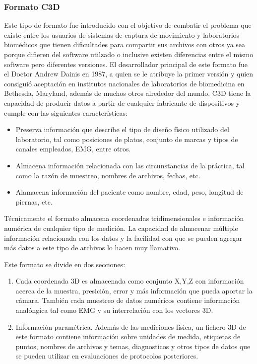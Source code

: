 \documentclass[11pt,letterpaper]{article}     %
\begin{document}
\subsubsection{Formato C3D}
Este tipo de formato fue introducido con el objetivo de combatir el problema que existe entre los usuarios de sistemas de captura de movimiento y laboratorios biom\' edicos que tienen dificultades para compartir sus archivos con otros ya sea porque difieren del software utilzado o inclusive existen diferencias entre el mismo software pero diferentes versiones. 
El desarrollador principal de este formato fue el Doctor Andrew Dainis en 1987, a quien se le atribuye la primer versi\' on y quien consigui\' o aceptaci\' on en institutos nacionales de laboratorios de biomedicina en Bethesda, Maryland, adem\' as de muchos otros alrededor del mundo.  C3D tiene la capacidad de producir datos a partir de cualquier fabricante de dispositivos y cumple con las siguientes caracter\' isticas:
\begin{itemize}
\item Preserva informaci\' on que describe el tipo de dise\~ no f\' isico utilizado del laboratorio, tal como posiciones de platos, conjunto de marcas y tipos de canales empleados, EMG, entre otros.

\item Almacena informaci\' on relacionada con las circunstancias de la pr\' actica, tal como la raz\' on de muestreo, nombres de archivos, fechas, etc.

\item Alamacena informaci\' on del paciente como nombre, edad, peso, longitud de piernas, etc.

\end{itemize}

T\' ecnicamente el formato almacena coordenadas tridimensionales e informaci\' on num\' erica de cualquier tipo de medici\' on. La capacidad de almacenar m\' ultiple informaci\' on relacionada con los datos y la facilidad con que se pueden agregar m\' as datos a este tipo de archivos lo hacen muy llamativo.

Este formato se divide en dos secciones:

\begin{enumerate}
\item Cada coordenada 3D es almacenada como conjunto X,Y,Z con informaci\' on acerca de la muestra, presici\' on, error y m\' as informaci\' on que pueda aportar la c\' amara. 
Tambi\' en cada muestreo de datos num\' ericos contiene informaci\' on anal\' ongica tal como EMG y su interrelaci\' on con los vectores 3D. 

\item Informaci\' on param\' etrica. Adem\' as de las mediciones f\' isica, un fichero 3D de este formato contiene informaci\' on sobre unidades de medida, etiquetas de puntos, nombres de archivos y temas, diagnosticos y otros tipos de datos que se pueden utilizar en evaluaciones de protocolos posteriores.
\end{enumerate}
\end{document}
